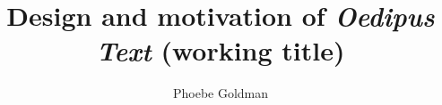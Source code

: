 \title{Design and motivation of \textit{Oedipus Text} (working title)}
\author{Phoebe Goldman}
\date{}

\newcommand{\theprof}{Professor Olga Taxidou}
\newcommand{\theclass}{Reimagining Greek Tragedy}
